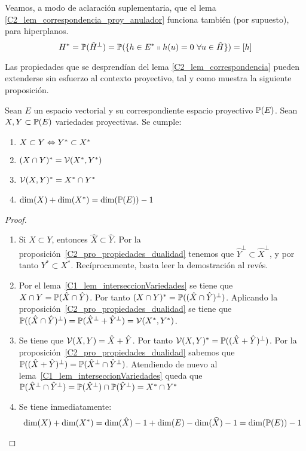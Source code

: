\begin{obs}
	Veamos, a modo de aclaración suplementaria, que el lema \ref{C2_lem_correspondencia_proy_anulador} funciona también (por supuesto), para hiperplanos.
	\begin{equation*}
	H^*=\mathbb{P}(\hat{H}^{\perp})=\mathbb{P}(\{h\in E^*\shortparallel h(u)=0\ \forall u\in \hat{H}\})=[h]
	\end{equation*}
\end{obs}
Las propiedades que se desprendían del lema \ref{C2_lem_correspondencia} pueden extenderse sin esfuerzo al contexto proyectivo, tal y como muestra la siguiente proposición.
\begin{prop}
	\label{C2_pro_propiedades_dualidad_proy}
	Sean $E$ un espacio vectorial y su correspondiente espacio proyectivo $\mathbb{P}(E)$. Sean $X,Y\subset\mathbb{P}(E)$ variedades proyectivas. Se cumple:
	\begin{enumerate}
		\item $X\subset Y\Leftrightarrow Y^*\subset X^*$
		
		\item $(X\cap Y)^*=\mathcal{V}(X^*,Y^*)$
		
		\item $\mathcal{V}(X,Y)^*=X^*\cap Y^*$
		
		\item $\dim(X)+\dim(X^*)=\dim(\mathbb{P}(E))-1$
	\end{enumerate}
\end{prop}
\begin{proof}
	\begin{enumerate}
		\item Si $X\subset Y$, entonces $\hat{X}\subset\hat{Y}$. Por la proposición~\ref{C2_pro_propiedades_dualidad} tenemos que $\hat{Y}^{\perp}\subset \hat{X}^{\perp}$, y por tanto $Y^*\subset X^*$. Recíprocamente, basta leer la demostración al revés.
		
		\item Por el lema~\ref{C1_lem_interseccionVariedades} se tiene que $X\cap Y=\mathbb{P}(\hat{X}\cap\hat{Y})$. Por tanto $(X\cap Y)^*=\mathbb{P}((\hat{X}\cap\hat{Y})^{\perp})$. Aplicando la proposición~\ref{C2_pro_propiedades_dualidad} se tiene que $\mathbb{P}((\hat{X}\cap\hat{Y})^{\perp})=\mathbb{P}(\hat{X}^{\perp}+\hat{Y}^{\perp})=\mathcal{V}(X^*,Y^*)$.
		
		\item Se tiene que $\mathcal{V}(X,Y)=\hat{X}+\hat{Y}$. Por tanto $\mathcal{V}(X,Y)^*=\mathbb{P}((\hat{X}+\hat{Y})^{\perp})$. Por la proposición~\ref{C2_pro_propiedades_dualidad} sabemos que $\mathbb{P}((\hat{X}+\hat{Y})^{\perp})=\mathbb{P}(\hat{X}^{\perp}\cap\hat{Y}^{\perp})$. Atendiendo de nuevo al lema~\ref{C1_lem_interseccionVariedades} queda que $\mathbb{P}(\hat{X}^{\perp}\cap\hat{Y}^{\perp})=\mathbb{P}(\hat{X}^{\perp})\cap\mathbb{P}(\hat{Y}^{\perp})=X^*\cap Y^*$
		
		\item Se tiene inmediatamente:
		\begin{equation*}
		\dim(X)+\dim(X^*)=\dim(\hat{X})-1+\dim(E)-\dim(\widehat{X})-1=\dim(\mathbb{P}(E))-1
		\end{equation*}
	\end{enumerate}
\end{proof}
